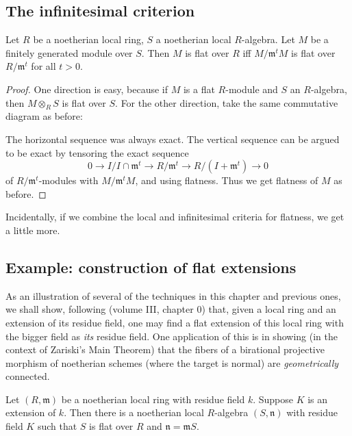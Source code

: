 \subsection{The infinitesimal criterion}

\begin{theorem} Let $R$ be a noetherian local ring, $S$ a noetherian local
$R$-algebra. Let $M$ be a finitely generated module over $S$.  Then $M$ is
flat over $R$ iff $M/\mathfrak{m}^tM$ is flat over $R/\mathfrak{m}^t$ for all $t>0$.
\end{theorem}
\begin{proof} 
One direction is easy, because if $M$ is a flat $R$-module and $S$ an $R$-algebra, then $M \otimes_R S$ is flat over $S$. 
For the other direction, take the same commutative diagram as before:\\

The horizontal sequence was always exact.  The vertical sequence can be argued to be exact by tensoring the exact sequence 
\[ 0 \to  I/I  \cap \mathfrak{m}^t \to R/\mathfrak{m}^t \to R/(I+\mathfrak{m}^t) \to 0\]
of $R/\mathfrak{m}^t$-modules with $M/\mathfrak{m}^tM$, and using flatness.
Thus we get flatness of $M$ as before.

\end{proof} 
Incidentally, if we combine the local and infinitesimal criteria for flatness, we get a little more.

\subsection{Example: construction of flat extensions}

As an illustration of several of the techniques in this chapter and previous
ones, we shall show, following \cite{EGA} (volume III, chapter 0) that, given a
local ring and an extension of its residue field, one may find a flat
extension of this local ring with the bigger field as \emph{its} residue
field. One application of this is in showing (in the context of Zariski's
Main Theorem) that the fibers of a birational
projective morphism of noetherian schemes (where the target is normal) are
\emph{geometrically} connected.

\begin{theorem} 
Let $(R, \mathfrak{m})$ be a noetherian local ring with residue field $k$.
Suppose $K$ is an extension of $k$. Then there is a noetherian local
$R$-algebra $(S,
\mathfrak{n})$ with residue field $K$ such that $S$ is flat over $R$ and $\mathfrak{n} =
\mathfrak{m}S$.
\end{theorem} 

